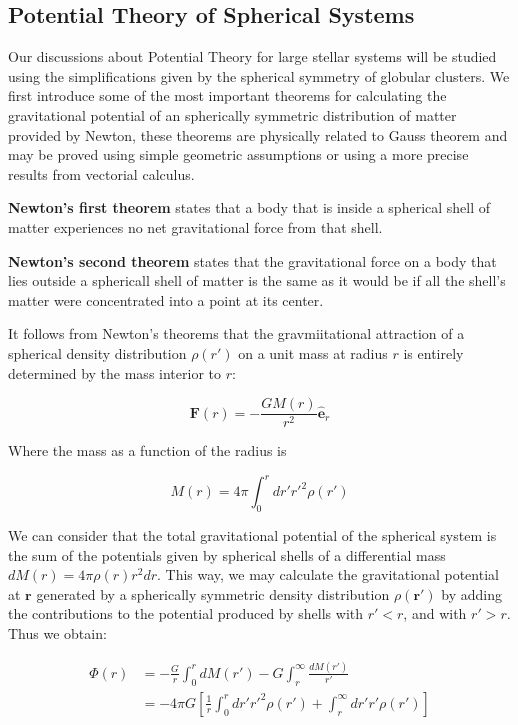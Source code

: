 \subsection{Potential Theory of Spherical Systems}

Our discussions about Potential Theory for large stellar systems will be studied using the simplifications given by the spherical symmetry of globular clusters. We first introduce some of the most important theorems for calculating the gravitational potential of an spherically symmetric distribution of matter provided by Newton, these theorems are physically related to Gauss theorem and may be proved using simple geometric assumptions or using a more precise results from vectorial calculus.

\textbf{Newton's first theorem} states that a body that is inside a spherical shell of matter experiences no net gravitational force from that shell. 

\textbf{Newton's second theorem} states that the gravitational force on a body that lies outside a sphericall shell of matter is the same as it would be if all the shell's matter were concentrated into a point at its center. 

It follows from Newton's theorems that the gravmiitational attraction of a spherical density distribution $\rho(r')$ on a unit mass at radius $r$ is entirely determined by the mass interior to $r$:

\begin{equation}
\textbf{F}(r)=-\frac{GM(r)}{r^{2}}\hat{\textbf{e}}_{r}
\end{equation}

Where the mass as a function of the radius is

\begin{equation}
M(r)=4\pi\int_{0}^{r}dr'r'^{2}\rho(r')
\end{equation}

We can consider that the total gravitational potential of the spherical system is the sum of the potentials given by spherical shells of a differential mass $dM(r)=4\pi\rho(r)r^{2}dr$. This way, we may calculate the gravitational potential at $\textbf{r}$ generated by a spherically symmetric density distribution $\rho(\textbf{r}')$ by adding the contributions to the potential produced by shells with $r'<r$, and with $r'>r$. Thus we obtain:

\begin{equation}
	\begin{aligned}	
	\Phi(r) &= -\frac{G}{r}\int_{0}^{r}dM(r')-G\int_{r}^{\infty}\frac{dM(r')} {r'}\\      &= -4\pi G\left[\frac{1}{r}\int_{0}^{r}dr'r'^{2}\rho(r')+\int_{r}^{\infty}dr'r'\rho(r')\right]
	\end{aligned}
\end{equation} 

